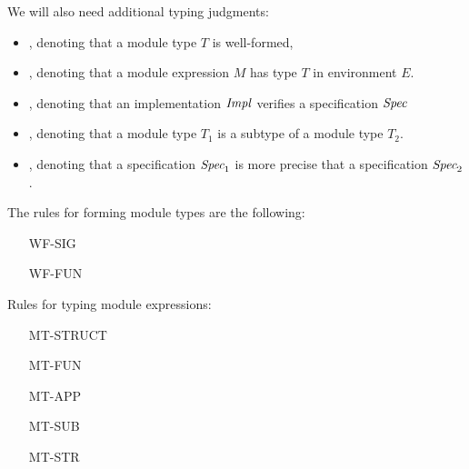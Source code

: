 We will also need additional typing judgments: 
\begin{itemize}
\item {}, denoting that a module type $T$ is well-formed, 

\item {}, denoting that a module expression $M$ has type $T$ in
environment $E$.

\item {}, denoting that an implementation ${\it Impl}$
  verifies a specification $\textit{Spec}$

\item {}, denoting that a module type $T_1$ is a subtype of a
module type $T_2$.

\item {}, denoting that a specification
  $\textit{Spec}_1$ is more precise that a specification $\textit{Spec}_2$.
\end{itemize}
The rules for forming module types are the following:
\begin{itemize}
\item [WF-SIG]
\item [WF-FUN]
\end{itemize}
Rules for typing module expressions:
\begin{itemize}
\item [MT-STRUCT]
\item [MT-FUN]
\item [MT-APP]
\item [MT-SUB]
\item [MT-STR]
\end{itemize}
